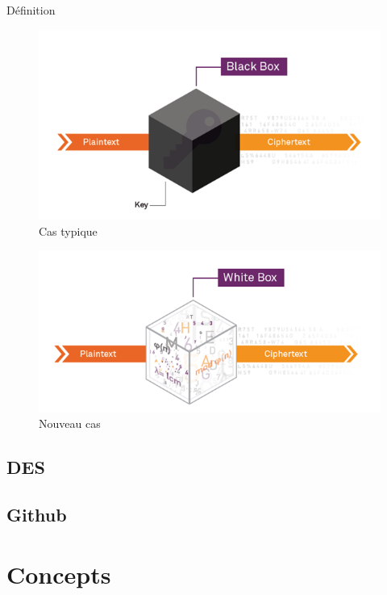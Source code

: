 \documentclass{beamer}
\begin{document}
\begin{frame}{Définition}

  \begin{figure}[h]
    \centering
    \includegraphics[scale=0.30]{./images/blackbox.png}
    \caption{Cas typique}
    \label{fig:keygen}
  \end{figure}

  \begin{figure}[h]
    \centering
    \includegraphics[scale=0.30]{./images/whitebox.png}
    \caption{Nouveau cas}
    \label{fig:keygen}
  \end{figure}

\end{frame}

\subsection{DES}

\subsection{Github}

\section{Concepts}
\end{document}
